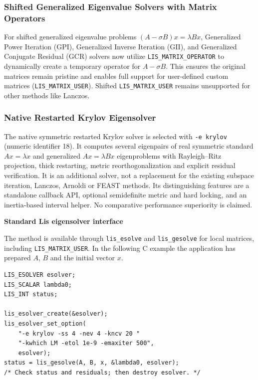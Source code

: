 \documentclass[a4paper]{article}
\begin{document}
\subsubsection{Shifted Generalized Eigenvalue Solvers with Matrix Operators}
For shifted generalized eigenvalue problems $(A - \sigma B)x = \lambda Bx$, Generalized Power Iteration (GPI), Generalized Inverse Iteration (GII), and Generalized Conjugate Residual (GCR) solvers now utilize \texttt{LIS\_MATRIX\_OPERATOR} to dynamically create a temporary operator for $A - \sigma B$. This ensures the original matrices remain pristine and enables full support for user-defined custom matrices (\texttt{LIS\_MATRIX\_USER}). Shifted \texttt{LIS\_MATRIX\_USER} remains unsupported for other methods like Lanczos.


\subsubsection{Native Restarted Krylov Eigensolver}
\label{subsubsec:native-krylov}
The native symmetric restarted Krylov solver is selected with
\verb|-e krylov| (numeric identifier 18).  It computes several
eigenpairs of real symmetric standard $Ax=\lambda x$ and generalized
$Ax=\lambda Bx$ eigenproblems with Rayleigh--Ritz projection,
thick restarting, metric reorthogonalization and explicit residual
verification.  It is an additional solver, not a replacement for
the existing subspace iteration, Lanczos, Arnoldi or FEAST methods.
Its distinguishing features are a standalone callback API, optional
semidefinite metric and hard locking, and an inertia-based interval
helper.  No comparative performance superiority is claimed.

\noindent
{\bf Standard Lis eigensolver interface}

The method is available through \verb|lis_esolve| and
\verb|lis_gesolve| for local matrices, including
\texttt{LIS\_MATRIX\_USER}.  In the following C example the
application has prepared $A$, $B$ and the initial vector $x$.

\begin{verbatim}
LIS_ESOLVER esolver;
LIS_SCALAR lambda0;
LIS_INT status;

lis_esolver_create(&esolver);
lis_esolver_set_option(
    "-e krylov -ss 4 -nev 4 -kncv 20 "
    "-kwhich LM -etol 1e-9 -emaxiter 500",
    esolver);
status = lis_gesolve(A, B, x, &lambda0, esolver);
/* Check status and residuals; then destroy esolver. */
\end{verbatim}
\end{document}
